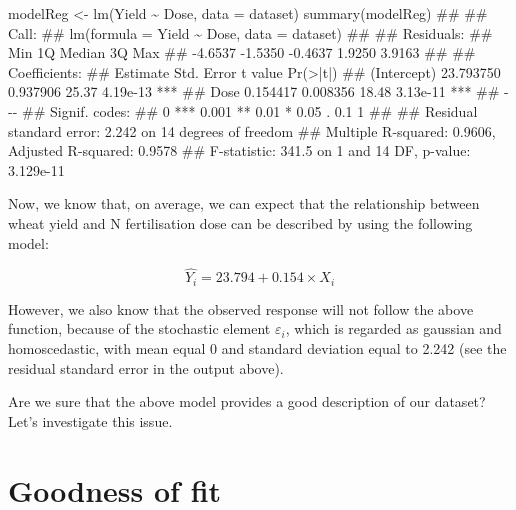 \documentclass[a4paper,12pt,oneside]{book}
\newenvironment{Shaded}{\begin{snugshade}}{\end{snugshade}}
\newcommand{\SpecialCharTok}[1]{#1}
\newcommand{\DocumentationTok}[1]{#1}
\newcommand{\OtherTok}[1]{#1}
\newcommand{\FunctionTok}[1]{#1}
\newcommand{\AttributeTok}[1]{#1}
\newcommand{\NormalTok}[1]{#1}
\begin{document}
\begin{Shaded}
\begin{Highlighting}[]
\NormalTok{modelReg }\OtherTok{\textless{}{-}} \FunctionTok{lm}\NormalTok{(Yield }\SpecialCharTok{\textasciitilde{}}\NormalTok{ Dose, }\AttributeTok{data =}\NormalTok{ dataset)}
\FunctionTok{summary}\NormalTok{(modelReg)}
\DocumentationTok{\#\# }
\DocumentationTok{\#\# Call:}
\DocumentationTok{\#\# lm(formula = Yield \textasciitilde{} Dose, data = dataset)}
\DocumentationTok{\#\# }
\DocumentationTok{\#\# Residuals:}
\DocumentationTok{\#\#     Min      1Q  Median      3Q     Max }
\DocumentationTok{\#\# {-}4.6537 {-}1.5350 {-}0.4637  1.9250  3.9163 }
\DocumentationTok{\#\# }
\DocumentationTok{\#\# Coefficients:}
\DocumentationTok{\#\#              Estimate Std. Error t value Pr(\textgreater{}|t|)    }
\DocumentationTok{\#\# (Intercept) 23.793750   0.937906   25.37 4.19e{-}13 ***}
\DocumentationTok{\#\# Dose         0.154417   0.008356   18.48 3.13e{-}11 ***}
\DocumentationTok{\#\# {-}{-}{-}}
\DocumentationTok{\#\# Signif. codes:  }
\DocumentationTok{\#\# 0 \textquotesingle{}***\textquotesingle{} 0.001 \textquotesingle{}**\textquotesingle{} 0.01 \textquotesingle{}*\textquotesingle{} 0.05 \textquotesingle{}.\textquotesingle{} 0.1 \textquotesingle{} \textquotesingle{} 1}
\DocumentationTok{\#\# }
\DocumentationTok{\#\# Residual standard error: 2.242 on 14 degrees of freedom}
\DocumentationTok{\#\# Multiple R{-}squared:  0.9606, Adjusted R{-}squared:  0.9578 }
\DocumentationTok{\#\# F{-}statistic: 341.5 on 1 and 14 DF,  p{-}value: 3.129e{-}11}
\end{Highlighting}
\end{Shaded}

Now, we know that, on average, we can expect that the relationship between wheat yield and N fertilisation dose can be described by using the following model:

\[\hat{Y_i} = 23.794 + 0.154 \times X_i\]

However, we also know that the observed response will not follow the above function, because of the stochastic element \(\varepsilon_i\), which is regarded as gaussian and homoscedastic, with mean equal 0 and standard deviation equal to 2.242 (see the residual standard error in the output above).

Are we sure that the above model provides a good description of our dataset? Let's investigate this issue.

\hypertarget{goodness-of-fit}{%
\section{Goodness of fit}\label{goodness-of-fit}}
\end{document}
